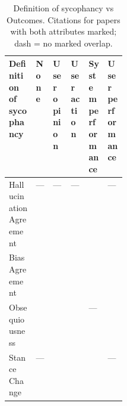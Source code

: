 \begin{table}[!htbp]
\centering
\small
\setlength{\tabcolsep}{4pt}
\renewcommand{\arraystretch}{1.3}
\caption{Definition of sycophancy vs Outcomes. Citations for papers with both attributes marked; dash = no marked overlap.}
\begin{tabularx}{\linewidth}{|>{\raggedright\arraybackslash}p{0.23\linewidth}|>{\centering\arraybackslash}X|>{\centering\arraybackslash}X|>{\centering\arraybackslash}X|>{\centering\arraybackslash}X|>{\centering\arraybackslash}X|}
\hline
\textbf{Definition of sycophancy} & \textbf{\hspace{0pt}None} & \textbf{\hspace{0pt}User opinion} & \textbf{\hspace{0pt}User action} & \textbf{\hspace{0pt}System performance} & \textbf{\hspace{0pt}User performance} \\ \hline
Hallucination Agreement & --- & --- & --- & \cite{10.1109/ICASSP55912.2026.11460702} \cite{10.1109/SCW63240.2024.00017} \cite{10.1145/3703155} \cite{10.1145/3746027.3755778} & --- \\ \hline
Bias Agreement & \cite{10.1145/3772318.3791915} \cite{10.1145/3776734.3794532} \cite{10.1145/3786304.3787879} & \cite{10.1145/3706599.3719976} \cite{10.1145/3772318.3790934} \cite{10.1145/3772318.3791149} \cite{10.1145/3772318.3791233} \cite{10.1145/3772318.3791851} \cite{10.1145/3772363.3798705} & \cite{10.1145/3772318.3790934} \cite{10.1145/3772318.3791149} & \cite{10.1145/3772318.3791233} \cite{10.1145/3772318.3791300} \cite{10.1145/3774904.3792506} \cite{10.1145/3788646.3789536} & \cite{10.1145/3717511.3747073} \cite{10.1145/3772318.3790934} \\ \hline
Obsequiousness & \cite{10.1145/3660650.3660656} \cite{10.1145/3744169.3744194} \cite{10.1145/3776734.3794532} & \cite{10.1145/3772318.3790934} \cite{10.1145/3772318.3791079} \cite{10.1145/3772318.3791149} & \cite{10.1109/AIxVR67263.2026.00026} \cite{10.1145/3772318.3790934} \cite{10.1145/3772318.3791149} & --- & \cite{10.1145/3772318.3790934} \\ \hline
Stance Change & --- & \cite{10.1145/3719160.3736618} \cite{10.1145/3772318.3790385} \cite{10.1145/3772318.3791079} & \cite{10.1145/3719160.3736618} \cite{10.1145/3772318.3790385} & \cite{10.1109/BigData62323.2024.10825538} \cite{10.1109/ICASSP55912.2026.11460702} \cite{10.1145/3746027.3755778} \cite{10.1145/3774904.3792506} \cite{10.1145/3786335.3813137} & --- \\ \hline

\end{tabularx}
\end{table}
